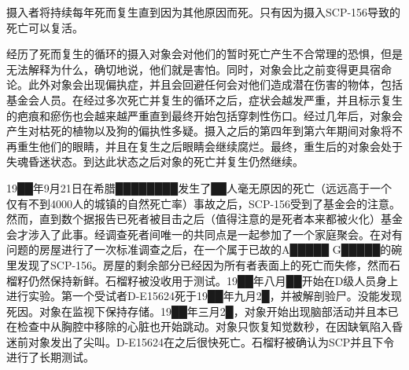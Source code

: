 摄入者将持续每年死而复生直到因为其他原因而死。只有因为摄入SCP-156导致的死亡可以复活。

经历了死而复生的循环的摄入对象会对他们的暂时死亡产生不合常理的恐惧，但是无法解释为什么，确切地说，他们就是害怕。同时，对象会比之前变得更具宿命论。此外对象会出现偏执症，并且会回避任何会对他们造成潜在伤害的物体，包括基金会人员。在经过多次死亡并复生的循环之后，症状会越发严重，并且标示复生的疤痕和瘀伤也会越来越严重直到最终开始包括穿刺性伤口。经过几年后，对象会产生对枯死的植物以及狗的偏执性多疑。摄入之后的第四年到第六年期间对象将不再重生他们的眼睛，并且在复生之后眼睛会继续腐烂。最终，重生后的对象会处于失魂昏迷状态。到达此状态之后对象的死亡并复生仍然继续。

19██年9月21日在希腊████████发生了██人毫无原因的死亡（远远高于一个仅有不到4000人的城镇的自然死亡率）事故之后，SCP-156受到了基金会的注意。然而，直到数个据报告已死者被目击之后（值得注意的是死者本来都被火化）基金会才涉入了此事。经调查死者间唯一的共同点是一起参加了一个家庭聚会。在对有问题的房屋进行了一次标准调查之后，在一个属于已故的A█████ G█████的碗里发现了SCP-156。房屋的剩余部分已经因为所有者表面上的死亡而失修，然而石榴籽仍然保持新鲜。石榴籽被没收用于测试。19██年八月██开始在D级人员身上进行实验。第一个受试者D-E15624死于19██年九月2█，并被解剖验尸。没能发现死因。对象在监视下保持存储。19██年三月2█，对象开始出现脑部活动并且本已在检查中从胸腔中移除的心脏也开始跳动。对象只恢复知觉数秒，在因缺氧陷入昏迷前对象发出了尖叫。D-E15624在之后很快死亡。石榴籽被确认为SCP并且下令进行了长期测试。
